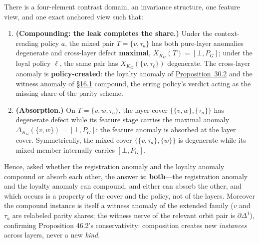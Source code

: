
\begin{thmplain}

There is a four-element contrast domain, an invariance structure, one feature view, and one exact anchored view such that:

\begin{enumerate}
\def\labelenumi{\arabic{enumi}.}
\tightlist
\item
  \textbf{(Compounding: the leak completes the share.)} Under the context-reading policy \(a\), the mixed pair \(T = \{v, \tau_a\}\) has both pure-layer anomalies degenerate and cross-layer defect \textbf{maximal}, \(X_{K_G}(T) = [\bot, P_G]\); under the loyal policy \(\ell\), the same pair has \(X_{K_G}(\{v, \tau_\ell\})\) degenerate. The cross-layer anomaly is \textbf{policy-created}: the loyalty anomaly of \hyperlink{stmt:30.2}{Proposition~30.2} and the witness anomaly of \hyperlink{sec:16.1}{§16.1} compound, the erring policy's verdict acting as the missing share of the parity scheme.
\item
  \textbf{(Absorption.)} On \(T = \{v, w, \tau_a\}\), the layer cover \(\{\{v,w\}, \{\tau_a\}\}\) has degenerate defect while its feature stage carries the maximal anomaly \(\Delta_{K_G}(\{v,w\}) = [\bot, P_G]\): the feature anomaly is absorbed at the layer cover. Symmetrically, the mixed cover \(\{\{v, \tau_a\}, \{w\}\}\) is degenerate while its mixed member internally carries \([\bot, P_G]\).
\end{enumerate}

Hence, asked whether the registration anomaly and the loyalty anomaly compound or absorb each other, the answer is: \textbf{both}---\hspace{0pt}the registration anomaly and the loyalty anomaly can compound, and either can absorb the other, and which occurs is a property of the cover and the policy, not of the layers. Moreover the compound instance is itself a witness anomaly of the extended family (\(v\) and \(\tau_a\) are relabeled parity shares; the witness nerve of the relevant orbit pair is \(\partial\Delta^1\)), confirming Proposition 46.2's conservativity: composition creates new \emph{instances} across layers, never a new \emph{kind}.
\end{thmplain}

